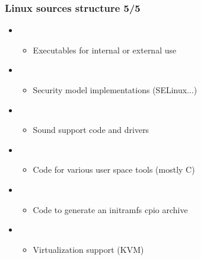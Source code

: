 \begin{frame}
  \frametitle{Linux sources structure 5/5}
  \begin{itemize}
  \item {}
    \begin{itemize}
    \item Executables for internal or external use
    \end{itemize}
  \item {}
    \begin{itemize}
    \item Security model implementations (SELinux...)
    \end{itemize}
  \item {}
    \begin{itemize}
    \item Sound support code and drivers
    \end{itemize}
  \item {}
    \begin{itemize}
    \item Code for various user space tools (mostly C)
    \end{itemize}
  \item {}
    \begin{itemize}
    \item Code to generate an initramfs cpio archive
    \end{itemize}
  \item {}
    \begin{itemize}
    \item Virtualization support (KVM)
    \end{itemize}
  \end{itemize}
\end{frame}
